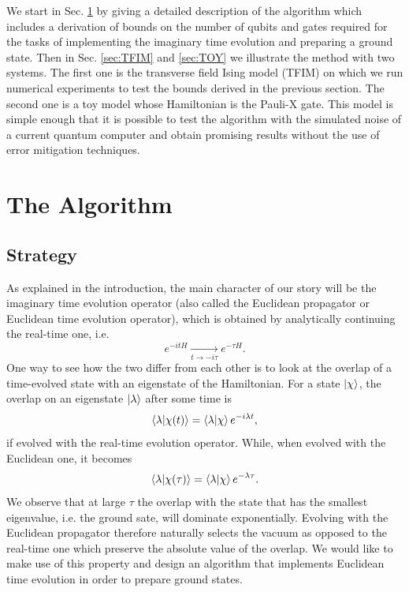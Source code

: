 \documentclass[a4paper,11pt]{article}
\begin{document}
We start in Sec. \ref{sec:algorithm} by giving a detailed description of the algorithm which includes a derivation of bounds on the number of qubits and gates required for the tasks of implementing the imaginary time evolution and preparing a ground state. Then in Sec. \ref{sec:TFIM} and \ref{sec:TOY} we illustrate the method with two systems. The first one is the transverse field Ising model (TFIM) on which we run numerical experiments to test the bounds derived in the previous section. The second one is a toy model whose Hamiltonian is the Pauli-X gate. This model is simple enough that it is possible to test the algorithm with the simulated noise of a current quantum computer and obtain promising results without the use of error mitigation techniques.



\section{The Algorithm}
\label{sec:algorithm}

\subsection{Strategy}
\label{sec:strategy}

As explained in the introduction, the main character of our story will be the imaginary time evolution operator (also called the Euclidean propagator or Euclidean time evolution operator), which is obtained by analytically continuing the real-time one, i.e.
\begin{equation}
    e^{-itH}\underset{t\to -i\tau}{\to} e^{-\tau H}. 
\end{equation}
One way to see how the two differ from each other is to look at the overlap of a time-evolved state with an eigenstate of the Hamiltonian. For a state $\ket{\chi}$, the overlap on an eigenstate $\ket{\lambda}$ after some time is 
\begin{equation}
\braket{\lambda}{\chi(t)}=\braket{\lambda}{\chi}e^{-i\lambda t},
\end{equation}
if evolved with the real-time evolution operator. While, when evolved with the Euclidean one, it becomes 
\begin{equation}
\braket{\lambda}{\chi(\tau)}=\braket{\lambda}{\chi}e^{-\lambda \tau}.
\end{equation}
We observe that at large $\tau$ the overlap with the state that has the smallest eigenvalue, i.e. the ground sate, will dominate exponentially. Evolving with the Euclidean propagator therefore naturally selects the vacuum as opposed to the real-time one which preserve the absolute value of the overlap. We would like to make use of this property and design an algorithm that implements Euclidean time evolution in order to prepare ground states.
\end{document}
